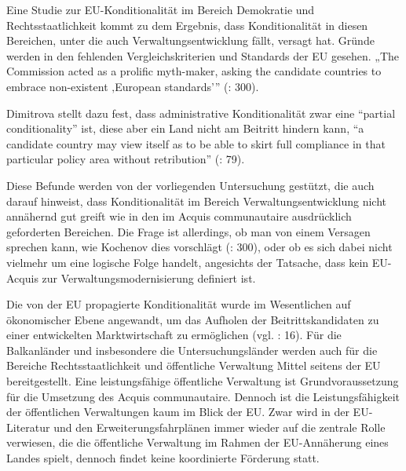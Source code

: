 Eine Studie zur EU-Konditionalität im Bereich Demokratie und Rechtsstaatlichkeit kommt zu dem Ergebnis, dass Konditionalität in diesen Bereichen, unter die auch Verwaltungsentwicklung fällt, versagt hat. Gründe werden in den fehlenden Vergleichskriterien und Standards der EU gesehen. „The Commission acted as a prolific myth-maker, asking the candidate countries to embrace non-existent ‚European standards’” (\cite{kochenov}: 300).\par
Dimitrova stellt dazu fest, dass administrative Konditionalität zwar eine “partial conditionality” ist, diese aber ein Land nicht am Beitritt hindern kann, “a candidate country may view itself as to be able to skirt full compliance in that particular policy area without retribution” (\cite{dimit05}: 79). \par
Diese Befunde werden von der vorliegenden Untersuchung gestützt, die auch darauf hinweist, dass Konditionalität im Bereich Verwaltungsentwicklung nicht annähernd gut greift wie in den im Acquis communautaire ausdrücklich geforderten Bereichen. Die Frage ist allerdings, ob man von einem Versagen sprechen kann, wie Kochenov dies vorschlägt (\cite{kochenov}: 300), oder ob es sich dabei nicht vielmehr um eine logische Folge handelt, angesichts der Tatsache, dass kein EU-Acquis zur Verwaltungsmodernisierung definiert ist.\par
Die von der EU propagierte Konditionalität wurde im Wesentlichen auf ökonomischer Ebene angewandt, um das Aufholen der Beitrittskandidaten zu einer entwickelten Marktwirtschaft zu ermöglichen (vgl. \cite{hugsas} : 16). Für die Balkanländer und insbesondere die Untersuchungsländer werden auch für die Bereiche Rechtsstaatlichkeit und öffentliche Verwaltung Mittel seitens der EU bereitgestellt. Eine leistungsfähige öffentliche Verwaltung ist Grundvoraussetzung für die Umsetzung des Acquis communautaire. Dennoch ist die Leistungsfähigkeit der öffentlichen Verwaltungen kaum im Blick der EU. Zwar wird in der EU-Literatur und den Erweiterungsfahrplänen immer wieder auf die zentrale Rolle verwiesen, die die öffentliche Verwaltung im Rahmen der EU-Annäherung eines Landes spielt, dennoch findet keine koordinierte Förderung statt. \par
